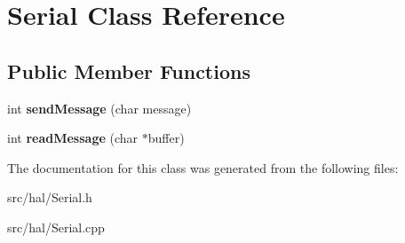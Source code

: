 \hypertarget{classSerial}{\section{Serial Class Reference}
\label{classSerial}
}
\subsection*{Public Member Functions}
\begin{DoxyCompactItemize}
\item 
\hypertarget{classSerial_a169ed0c2a5bccec7857ab501aaf35b87}{int {\bfseries send\-Message} (char message)}\label{classSerial_a169ed0c2a5bccec7857ab501aaf35b87}

\item 
\hypertarget{classSerial_a56af97dad1a41aa3a12de86209f1c1e3}{int {\bfseries read\-Message} (char $\ast$buffer)}\label{classSerial_a56af97dad1a41aa3a12de86209f1c1e3}

\end{DoxyCompactItemize}


The documentation for this class was generated from the following files\-:\begin{DoxyCompactItemize}
\item 
src/hal/Serial.\-h\item 
src/hal/Serial.\-cpp\end{DoxyCompactItemize}
